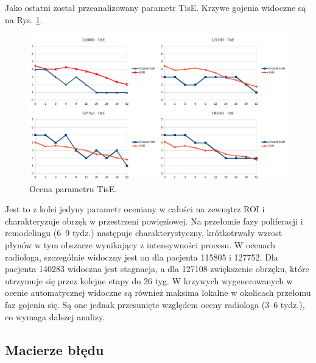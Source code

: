 Jako ostatni został przeanalizowany parametr TisE. Krzywe gojenia widoczne są na Rys. \ref{fig:TisE}.
\begin{figure}[h!]
	\centering
	\includegraphics[width=1\textwidth]{figures/TisE.png}
	\caption{Ocena parametru TisE.}\label{fig:TisE}
\end{figure}
Jest to z kolei jedyny parametr oceniany w całości na zewnątrz ROI i charakteryzuje obrzęk w przestrzeni powięziowej. Na przełomie fazy poliferacji i remodelingu (6--9 tydz.) następuje charakterystyczny, krótkotrwały wzrost płynów w tym obszarze wynikający z intensywności procesu. W ocenach radiologa, szczególnie widoczny jest on dla pacjenta 115805 i 127752. Dla pacjenta 140283 widoczna jest stagnacja, a dla 127108 zwiększenie obrzęku, które utrzymuje się przez kolejne etapy do 26 tyg. W krzywych wygenerowanych w ocenie automatycznej widoczne są również maksima lokalne w okolicach przełomu faz gojenia się. Są one jednak przesunięte względem oceny radiologa (3--6 tydz.), co wymaga dalszej analizy.

\subsection{Macierze błędu}

